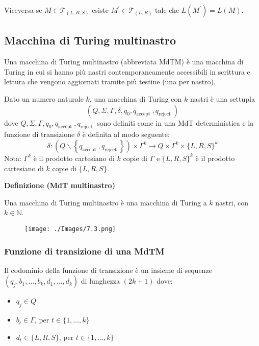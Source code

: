 Viceversa se $M \in \mathcal{T}_{(L, R, S)}$ esiste $M^{\prime} \in \mathcal{T}_{(L, R)}$ tale che $L\left(M^{\prime}\right)=L(M) .$

\subsection{Macchina di Turing multinastro}

Una macchina di Turing multinastro (abbreviata MdTM) è una
macchina di Turing in cui si hanno più nastri contemporaneamente
accessibili in scrittura e lettura che vengono aggiornati tramite più
testine (una per nastro).

\vspace{5mm}

Dato un numero naturale $k$, una macchina di Turing con $k$ nastri è una settupla
$$
\left(Q, \Sigma, \Gamma, \delta, q_{0}, q_{\text {accept }}, q_{\text {reject }}\right)
$$
dove $Q, \Sigma, \Gamma, q_{0}, q_{\text {accept }}, q_{\text {reject }}$ sono definiti come in una MdT deterministica e la funzione di transizione $\delta$ è definita al modo seguente:
$$
\delta:\left(Q \backslash\left\{q_{\text {accept }}, q_{\text {reject }}\right\}\right) \times \Gamma^{k} \rightarrow Q \times \Gamma^{k} \times\{L, R, S\}^{k}
$$
Nota: $\Gamma^{k}$ è il prodotto cartesiano di $k$ copie di $\Gamma$ e $\{L, R, S\}^{k}$ è il prodotto cartesiano di $k$ copie di $\{L, R, S\}$.

\vspace{5mm}

\textbf{Definizione (MdT multinastro)}

Una macchina di Turing multinastro è una macchina di Turing a $k$ nastri, con $k \in \mathbb{N}$.

\begin{figure}[hbpt!]
    \centering
    \texttt{[image: ./Images/7.3.png]}
\end{figure}
\FloatBarrier

\subsubsection{Funzione di transizione di una MdTM}

Il codominio della funzione di transizione è un insieme di sequenze $\left(q_{j}, b_{1}, \ldots, b_{k}, d_{1}, \ldots, d_{k}\right)$ di lunghezza $(2 k+1)$ dove:
\begin{itemize}
    \item $q_{j} \in Q$
    \item $b_{t} \in \Gamma$, per $t \in\{1, \ldots, k\}$
    \item $d_{t} \in\{L, R, S\}$, per $t \in\{1, \ldots, k\}$
\end{itemize}

